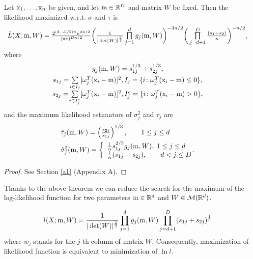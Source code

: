 \begin{theorem}\label{the:min}
Let $\mathrm{x}_1,\ldots,\mathrm{x}_n$ be given, and let $\mathrm{m} \in \mathbb{R}^D$ and matrix $W$
be fixed.  
Then the likelihood maximized w.r.t. $\sigma$ and $\tau$ is
\begin{equation}\label{eq:1}
\begin{array}{l}
 \hat{L}(X;\m,W) =   \frac{ 2^{(d-D/2)n} n^{dn/2} }{(\pi e)^{Dn/2}} %
 \bigg( \frac{1}{|\det(W)|^{\frac{2}{3}}} \prod\limits_{j=1}^{d} g_{j}(\m,W) \bigg)^{-3n/2} 
\bigg( \prod\limits_{j=d+1}^{D} \frac{(s_1+s_2)}{n} \bigg)^{-n/2},
\end{array}
\end{equation}
where
$$
\begin{array}{c}
{g}_{j}(\mathrm{m},W) = {s}_{1j}^{1/3} + {s}_{2j}^{1/3},
\\[1ex]
{s}_{1j}= \! \sum\limits_{i \in I_j}[ \omega_{j}^T (\mathrm{x}_i-\mathrm{m})]^2,  {I}_j=\{ i  \colon \omega_{j}^T (\mathrm{x}_i-\mathrm{m}) \leq 0 \},
\\[1ex]
{s}_{2j}= \! \sum\limits_{i \in I_j^c}[ \omega_{j}^T (\mathrm{x}_i-\mathrm{m})]^2, {I}_j^c=\{ i \colon  \omega_{j}^T (\mathrm{x}_i-\mathrm{m}) > 0 \},
\end{array}
$$
and the maximum likelihood estimators of $\sigma_{j}^2$ and $\tau_{j}$ are
\begin{equation}\label{eq:est}
\begin{array}{l}
\hat \tau_{j}(\mathrm{m},W)=\left(\frac{s_{2j}}{s_{1j}}\right)^{1/3}, \qquad 1 \leq j \leq d\\[6px]
\hat \sigma_j^2(\mathrm{m},W) = \left\{ \begin{array}{l}
\tfrac{1}{n} s_{1j}^{2/3} g_{j}(\mathrm{m},W), \; 1 \leq j \leq d\\
\tfrac{1}{n} (s_{1j}+s_{2j}), \qquad d < j \leq D\\
\end{array} \right. \!\!\!\!.
\end{array}
\end{equation}
\end{theorem}

\begin{proof}
See Section \ref{a1} (Appendix A).
\end{proof}

Thanks to the above theorem we can reduce the search for the maximum of the log-likelihood function for two parameters $\mathrm{m} \in \mathbb{R}^d$ and $W \in \mathcal{M}(\mathbb{R}^d)$.

\begin{equation}\label{equ:ll}
{l}(X;\mathrm{m},W) = \frac{1}{|\det(W)|^{\frac{2}{3}}} \prod_{j=1}^{d} {g}_{j}(\mathrm{m},W) \prod_{j=d+1}^{D} (s_{1j} + s_{2j})^{\frac{1}{3}}
\end{equation}
where $w_{j}$ stands for the $j$-th column of matrix $W$. 
Consequently, maximization of likelihood function is equivalent to minimization of  $\ln l$.

